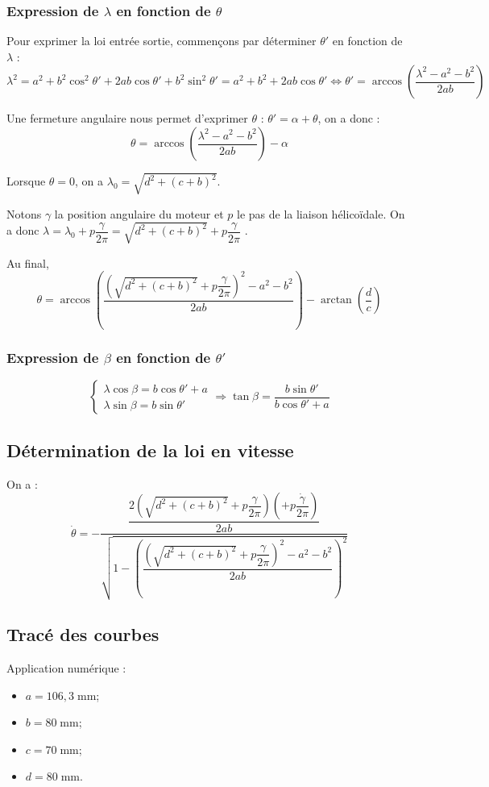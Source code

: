 \documentclass[10pt,fleqn]{article} %
\begin{document}
\subsubsection{Expression de $\lambda$ en fonction de $\theta$}
Pour exprimer la loi entrée sortie, commençons par déterminer $\theta'$ en fonction de $\lambda$ : 
$$
\lambda^2 
=  a^2 +b^2\cos^2\theta' + 2ab\cos\theta'  + b^2\sin^2 \theta'
=  a^2 +b^2 + 2ab\cos\theta' 
\Longleftrightarrow 
\theta' = \arccos \left(\dfrac{\lambda^2 - a^2 - b^2 }{2ab} \right)
$$

Une fermeture angulaire nous permet d'exprimer $\theta$ : $\theta' = \alpha + \theta$, on a donc :
$$
\theta = \arccos \left(\dfrac{\lambda^2 - a^2 - b^2 }{2ab} \right) - \alpha
$$

Lorsque $\theta=0$, on a $\lambda_0 = \sqrt{d^2 + (c+b)^2}$.


Notons $\gamma$ la position angulaire du moteur et $p$ le pas de la liaison hélicoïdale. On a donc $\lambda = \lambda_0 + p \dfrac{\gamma}{2\pi}=\sqrt{d^2 + (c+b)^2} + p \dfrac{\gamma}{2\pi}$ .

Au final, 
$$
\theta = \arccos \left(\dfrac{\left( \sqrt{d^2 + (c+b)^2} + p \dfrac{\gamma}{2\pi}\right)^2 - a^2 - b^2 }{2ab} \right) - \arctan\left( \dfrac{d}{c}\right)
$$

\subsubsection{Expression de $\beta$ en fonction de $\theta'$}
$$
\left\{
\begin{array}{l}
\lambda\cos\beta = b \cos\theta' + a \\
\lambda\sin \beta = b \sin \theta' 
\end{array}
\right.
\Rightarrow
\tan\beta = \dfrac{ b \sin \theta' }{b \cos\theta' + a}$$

\subsection{Détermination de la loi en vitesse}

On a :
$$
\dot{\theta} = -\dfrac{\dfrac{2\left( \sqrt{d^2 + (c+b)^2} + p \dfrac{\gamma}{2\pi}\right) \left( + p \dfrac{\dot{\gamma}}{2\pi}\right)  }{2ab} }{\sqrt{1-\left(\dfrac{\left( \sqrt{d^2 + (c+b)^2} + p \dfrac{\gamma}{2\pi}\right)^2 - a^2 - b^2 }{2ab} \right)^2}}
$$

\subsection{Tracé des courbes} 
Application numérique : 
\begin{itemize}
\item $a = 106,3\; \text{mm}$;
\item $b = 80 \; \text{mm}$;
\item $c = 70 \; \text{mm}$;
\item $d = 80 \; \text{mm}$.
\end{itemize}
\end{document}
